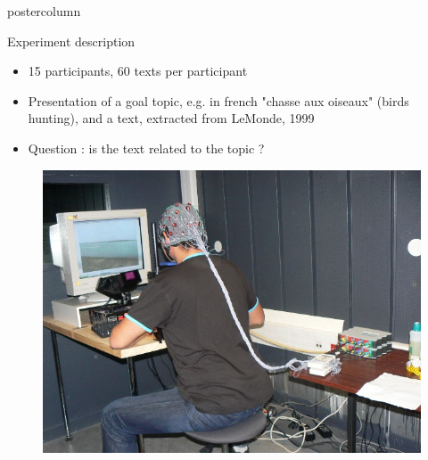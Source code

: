 \documentclass[final,hyperref={pdfpagelabels=false}]{beamer}
\newlength{\columnheight}
\begin{document}
\begin{frame}
  \begin{columns}
    \begin{column}{.50\textwidth}
      \begin{beamercolorbox}[center,wd=\textwidth]{postercolumn}
        \begin{minipage}[T]{.98\textwidth}  %
          \parbox[t][\columnheight]{\textwidth}{ %
            \begin{block}{Experiment description}
                \begin{itemize}
                    \item[\bullet] 15 participants, 60 texts per participant
                    \item[\bullet] Presentation of a goal topic, e.g. in french "chasse aux oiseaux" (birds hunting), and a text, extracted from LeMonde, 1999
                    \item[\bullet] Question : is the text related to the topic ?
                \end{itemize}
                \begin{minipage}{0.47\textwidth}
                    \begin{figure}[h]
                        \centering
                        \includegraphics[width=18cm]{efrp.jpg}

\end{figure}
\end{minipage}
\end{block}}
\end{minipage}
\end{beamercolorbox}
\end{column}
\end{columns}
\end{frame}
\end{document}
